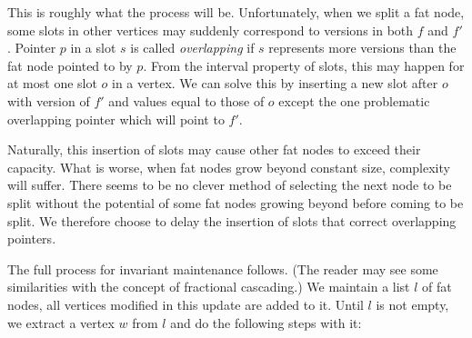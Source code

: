 This is roughly what the process will be. Unfortunately, when we split a fat node, some slots in other vertices may suddenly correspond to versions in both $f$ and $f'$. Pointer $p$ in a slot $s$ is called \emph{overlapping} if $s$ represents more versions than the fat node pointed to by $p$.
From the interval property of slots, this may happen for at most one slot $o$ in a vertex. We can solve this by inserting a new slot after $o$ with version of $f'$ and values equal to those of $o$ except the one problematic overlapping pointer which will point to $f'$.

Naturally, this insertion of slots may cause other fat nodes to exceed their capacity. What is worse, when fat nodes grow beyond constant size, complexity will suffer. There seems to be no clever method of selecting the next node to be split without the potential of some fat nodes growing beyond  before coming to be split. We therefore choose to delay the insertion of slots that correct overlapping pointers.

The full process for invariant maintenance follows. (The reader may see some similarities with the concept of fractional cascading.) We maintain a list $l$ of fat nodes, all vertices modified in this update are added to it. Until $l$ is not empty, we extract a vertex $w$ from $l$ and do the following steps with it:

